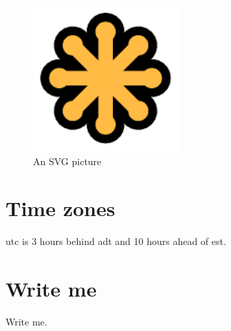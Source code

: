 \documentclass{article}
\begin{document}

\begin{figure}[!ht]
  \caption{An SVG picture}
  \centering
    \includegraphics[width=0.5\textwidth]{img/svg.pdf}
\end{figure}

% 


\section{Time zones}
\gls{utc} is 3 hours behind \gls{adt} and 10 hours ahead of \gls{est}.

\section{Write me}
\label{sec:write-me}
Write me.~\cite{www:pdflatex-makefile}


% 

\printglossaries
\end{document}
